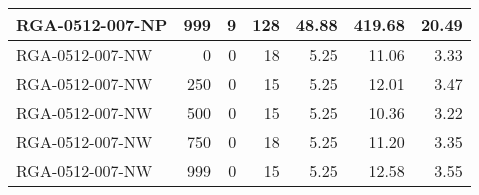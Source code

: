 \begin{table}[htbp]
{\begin{tabular}{lrrrrrr}
    RGA-0512-007-NP & 999    & 9      & 128    & 48.88  & 419.68 & 20.49 \\ \hline
    RGA-0512-007-NW & 0      & 0      & 18     & 5.25   & 11.06  & 3.33 \\
    RGA-0512-007-NW & 250    & 0      & 15     & 5.25   & 12.01  & 3.47 \\
    RGA-0512-007-NW & 500    & 0      & 15     & 5.25   & 10.36  & 3.22 \\
    RGA-0512-007-NW & 750    & 0      & 18     & 5.25   & 11.20  & 3.35 \\
    RGA-0512-007-NW & 999    & 0      & 15     & 5.25   & 12.58  & 3.55 \\
    \bottomrule
    \end{tabular}}
  \label{tab:addlabel}%
\end{table}%
